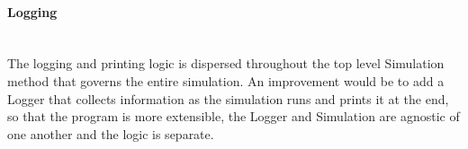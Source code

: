 \documentclass[12pt,oneside,a4paper]{article}
\begin{document}
\paragraph{Logging}\mbox{}\\
The logging and printing logic is dispersed throughout the top level
Simulation method that governs the entire simulation. An improvement
would be to add a Logger that collects information as the simulation
runs and prints it at the end, so that the program is more extensible,
the Logger and Simulation are agnostic of one another and the logic is
separate.
\end{document}
